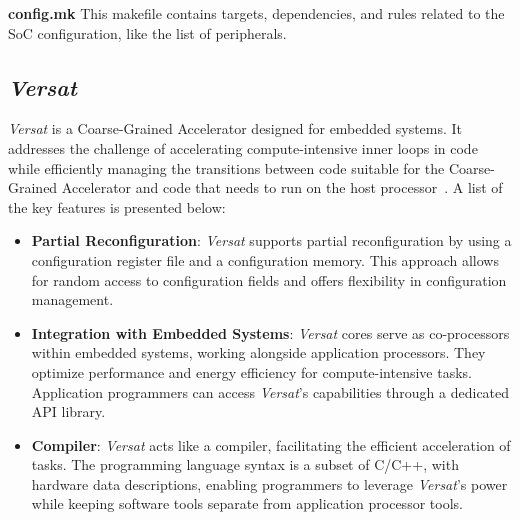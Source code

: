 \textbf{config.mk} This makefile contains targets, dependencies, and rules related to the SoC configuration, like the list of peripherals.


\subsection{\textit{Versat}}

\textit{Versat} is a Coarse-Grained Accelerator designed for embedded systems. It addresses the challenge of accelerating compute-intensive inner loops in code while efficiently managing the transitions between code suitable for the Coarse-Grained Accelerator and code that needs to run on the host processor~\cite{paperversat}. 
A list of the key features is presented below:

\begin{itemize}
    \item \textbf{Partial Reconfiguration}: \textit{Versat} supports partial reconfiguration by using a configuration register file and a configuration memory. This approach allows for random access to configuration fields and offers flexibility in configuration management.
    \item \textbf{Integration with Embedded Systems}: \textit{Versat} cores serve as co-processors within embedded systems, working alongside application processors. They optimize performance and energy efficiency for compute-intensive tasks. Application programmers can access \textit{Versat}'s capabilities through a dedicated API library.
    \item \textbf{Compiler}: \textit{Versat} acts like a compiler, facilitating the efficient acceleration of tasks. The programming language syntax is a subset of C/C++, with hardware data descriptions, enabling programmers to leverage \textit{Versat}'s power while keeping software tools separate from application processor tools.
\end{itemize}

\begin{comment}
\textit{Versat} is compatible with IOb-Soc. It can be integrated as a peripheral, since it contains an internal AXI DMA that allows communication with IOb-SoC's memory system, through an AXI-Interconnect. Figure \ref{fig:iobversat} shows the high-level block diagram of \textit{Versat} integrated into IOb-SoC.

\vspace{0.1cm}

\begin{figure}[H]
\centerline{\texttt{[image: iob-soc-versat.pdf]}}
\caption{\textit{Versat} integrated in IOb-SoC high-level block diagram.}
\label{fig:iobversat}
\end{figure}
\end{comment}

